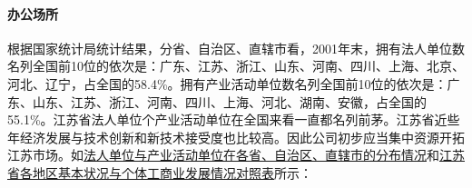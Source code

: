 \documentclass[violet]{main}
\begin{document}
				\paragraph{办公场所}
					根据国家统计局统计结果，分省、自治区、直辖市看，2001年末，拥有法人单位数名列全国前10位的依次是：广东、江苏、浙江、山东、河南、四川、上海、北京、河北、辽宁，占全国的58.4\%。拥有产业活动单位数名列全国前10位的依次是：广东、山东、江苏、浙江、河南、四川、上海、河北、湖南、安徽，占全国的55.1\%。江苏省法人单位个产业活动单位在全国来看一直都名列前茅。江苏省近些年经济发展与技术创新和新技术接受度也比较高。因此公司初步应当集中资源开拓江苏市场。如\hyperlink{法人单位与产业活动单位在各省、自治区、直辖市的分布情况}{法人单位与产业活动单位在各省、自治区、直辖市的分布情况}和\hyperlink{江苏省各地区基本状况与个体工商业发展情况对照表}{江苏省各地区基本状况与个体工商业发展情况对照表}所示：
					\begin{center}
						\Tcbset{}
\end{center}
\end{document}
